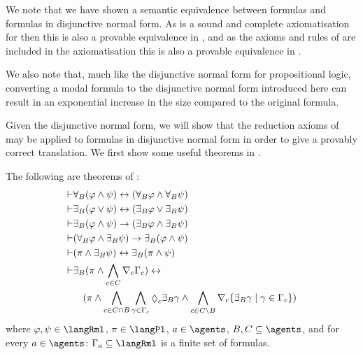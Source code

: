 We note that we have shown a semantic equivalence between \langMl{} formulas and formulas in disjunctive normal form.
As \axiomK{} is a sound and complete axiomatisation for \logicK{} then this is also a provable equivalence in \axiomK{}, and as the axioms and rules of \axiomK{} are included in the axiomatisation \axiomRmlK{} this is also a provable equivalence in \axiomRmlK{}.

We also note that, much like the disjunctive normal form for propositional logic, converting a modal formula to the disjunctive normal form introduced here can result in an exponential increase in the size compared to the original formula.

Given the disjunctive normal form, we will show that the reduction axioms of \axiomRmlK{} may be applied to formulas in disjunctive normal form in order to give a provably correct translation.
We first show some useful theorems in \axiomRmlK{}.

\begin{lemma}\label{rml-k-theorems}
The following are theorems of \axiomRmlK{}:
\begin{align}
    \proves & \allrefsBs (\phi \land \psi) \iff (\allrefsBs \phi \land \allrefsBs \psi) \label{rml-k-and}\\
    \proves & \somerefsBs (\phi \lor \psi) \iff (\somerefsBs \phi \lor \somerefsBs \psi) \label{rml-k-or}\\
    \proves & \somerefsBs (\phi \land \psi) \implies (\somerefsBs \phi \land \somerefsBs \psi) \label{rml-k-d-and}\\
    \proves & (\allrefsBs \phi \land \somerefsBs \psi) \implies \somerefsBs (\phi \land \psi) \label{rml-k-db-and}\\
    \proves & (\pi \land \somerefsBs \psi) \iff \somerefsBs (\pi \land \psi) \label{rml-k-pd-and}\\
    \proves & \displaystyle \somerefsBs (\pi \land \bigwedge_{\agentC \in \agentsC} \coverC \Gamma_\agentC) \iff \nonumber\\
            & \displaystyle \quad
            (
            \pi \land
            \bigwedge_{\agentC \in \agentsC \cap \agentsB} \bigwedge_{\gamma \in \Gamma_\agentC} \possibleC \somerefsBs \gamma \land
            \bigwedge_{\agentC \in \agentsC \setminus \agentsB} \coversC \{\somerefsBs \gamma \mid \gamma \in \Gamma_\agentC\} 
            ) \label{rml-k-cover}
\end{align}
where $\phi, \psi \in \langRml$, $\pi \in \langPl$, $\agentA \in \agents$, $\agentsB, \agentsC \subseteq \agents$, and for every $\agentA \in \agents$: $\Gamma_\agentA \subseteq \langRml$ is a finite set of formulas.
\end{lemma}

